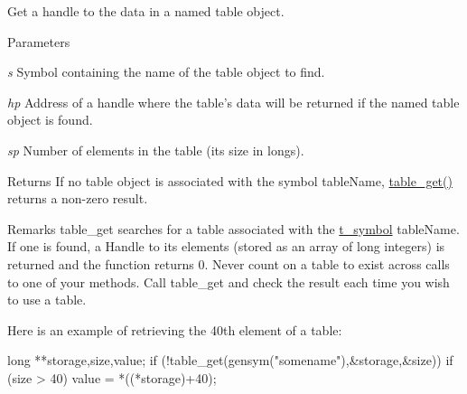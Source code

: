 Get a handle to the data in a named table object. 
\begin{DoxyParams}{Parameters}
\item[{\em s}]Symbol containing the name of the table object to find. \item[{\em hp}]Address of a handle where the table’s data will be returned if the named table object is found. \item[{\em sp}]Number of elements in the table (its size in longs). \end{DoxyParams}
\begin{DoxyReturn}{Returns}
If no table object is associated with the symbol tableName, \hyperlink{group__tables_ga2c08d1383a235eb8c106c0f3afea6d21}{table\_\-get()} returns a non-\/zero result.
\end{DoxyReturn}
\begin{DoxyRemark}{Remarks}
table\_\-get searches for a table associated with the \hyperlink{structt__symbol}{t\_\-symbol} tableName. If one is found, a Handle to its elements (stored as an array of long integers) is returned and the function returns 0. Never count on a table to exist across calls to one of your methods. Call table\_\-get and check the result each time you wish to use a table.
\end{DoxyRemark}
Here is an example of retrieving the 40th element of a table: 
\begin{DoxyCode}
    long **storage,size,value; 
    if (!table_get(gensym("somename"),&storage,&size)) { 
        if (size > 40) 
            value = *((*storage)+40); 
    }
\end{DoxyCode}
 